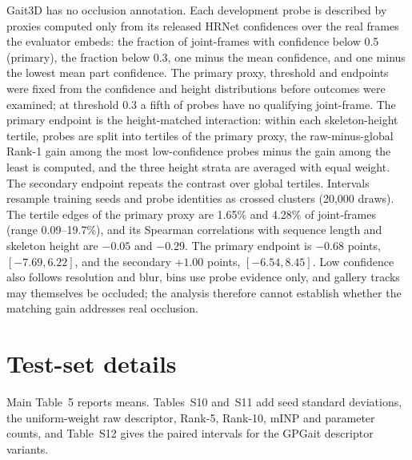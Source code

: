 \documentclass[11pt]{article}
\newcommand{\tablesetup}{\small\setlength{\tabcolsep}{4pt}}
\begin{document}
Gait3D has no occlusion annotation. Each development probe is described by
proxies computed only from its released HRNet confidences over the real frames
the evaluator embeds: the fraction of joint-frames with confidence below 0.5
(primary), the fraction below 0.3, one minus the mean confidence, and one minus
the lowest mean part confidence. The primary proxy, threshold and endpoints were
fixed from the confidence and height distributions before outcomes were
examined; at threshold 0.3 a fifth of probes have no qualifying joint-frame.
The primary endpoint is the height-matched interaction: within each
skeleton-height tertile, probes are split into tertiles of the primary proxy,
the raw-minus-global Rank-1 gain among the most low-confidence probes minus the
gain among the least is computed, and the three height strata are averaged with
equal weight. The secondary endpoint repeats the contrast over global tertiles.
Intervals resample training seeds and probe identities as crossed clusters
(20,000 draws). The tertile edges of the primary proxy are 1.65\% and 4.28\% of
joint-frames (range 0.09--19.7\%), and its Spearman correlations with
sequence length and skeleton height are $-0.05$ and $-0.29$. The primary
endpoint is $-0.68$ points, $[-7.69,6.22]$, and the secondary $+1.00$ points,
$[-6.54,8.45]$. Low confidence also follows resolution and blur, bins use probe
evidence only, and gallery tracks may themselves be occluded; the analysis
therefore cannot establish whether the matching gain addresses real
occlusion.

\section{Test-set details}
\label{sec:s-test}

Main Table~5 reports means. Tables~S10 and~S11 add seed standard deviations,
the uniform-weight raw descriptor, Rank-5, Rank-10, mINP and parameter counts,
and Table~S12 gives the paired intervals for the GPGait descriptor variants.

\begin{table}[!htbp]
\centering
\caption{CASIA-B official test (identities 075--124), standard single-view
protocol excluding identical views, Rank-1 (\%). Our rows give mean $\pm$
standard deviation over five seeds of the metric baseline; reproduced
baselines were trained once with official FastPoseGait configurations, and
reported values are those of the FastPoseGait model zoo. Parameters include
each model's identity classifier.}
\label{tab:s-casia-test}
{\tablesetup\footnotesize
}
\end{table}
\end{document}
